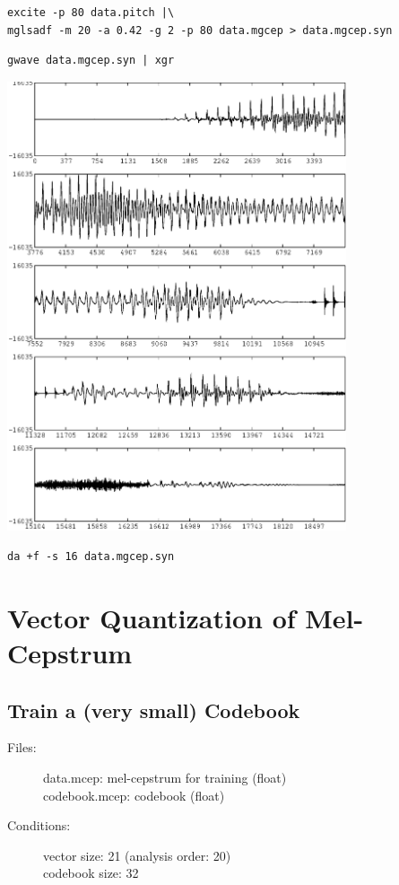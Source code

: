 \documentclass[a4paper,10pt]{article}
\begin{document}
\begin{verbatim}
excite -p 80 data.pitch |\
mglsadf -m 20 -a 0.42 -g 2 -p 80 data.mgcep > data.mgcep.syn
\end{verbatim}

\begin{verbatim}
gwave data.mgcep.syn | xgr
\end{verbatim}

\includegraphics[width=10cm]{data.mgcep.syn.gwave.eps}

\begin{verbatim}
da +f -s 16 data.mgcep.syn
\end{verbatim}

\section{Vector Quantization of Mel-Cepstrum}

\subsection{Train a (very small) Codebook}
\begin{description}
\item[Files:]
   data.mcep: mel-cepstrum for training (float) \\
   codebook.mcep: codebook (float)
\item[Conditions:]
   vector size: 21 (analysis order: 20)\\
   codebook size: 32
\end{description}
\end{document}
